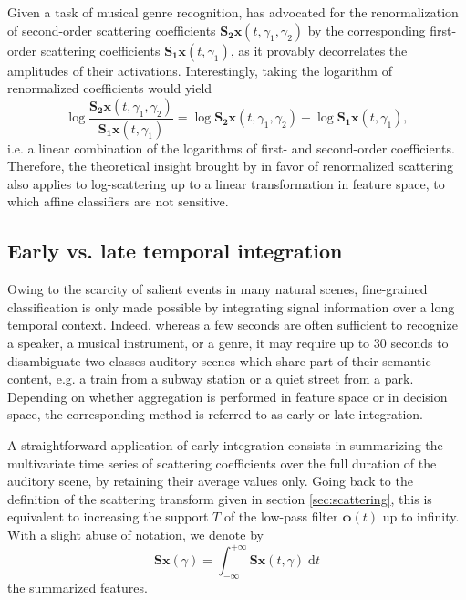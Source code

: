 \documentclass[journal]{IEEEtran}
\makeatletter
\newcommand*{\eg}{e.g.\@\xspace}
\newcommand*{\ie}{i.e.\@\xspace}
\newcommand*{\vs}{vs.\@\xspace}
\makeatother
\begin{document}
Given a task of musical genre recognition, \cite{Anden2014} has advocated for the renormalization of second-order scattering coefficients $\mathbf{S_2}\boldsymbol{x}(t,\gamma_1,\gamma_2)$ by the corresponding first-order scattering coefficients $\mathbf{S_1}\boldsymbol{x}(t,\gamma_1)$, as it provably decorrelates the amplitudes of their activations.
Interestingly, taking the logarithm of renormalized coefficients would yield
\begin{equation}
\log \dfrac{\mathbf{S_2}\boldsymbol{x}(t,\gamma_1,\gamma_2)}{\mathbf{S_1}\boldsymbol{x}(t,\gamma_1)} =
\log \mathbf{S_2}\boldsymbol{x}(t, \gamma_1, \gamma_2) -
\log \mathbf{S_1}\boldsymbol{x}(t, \gamma_1),
\end{equation}
\ie a linear combination of the logarithms of first- and second-order coefficients.
Therefore, the theoretical insight brought by \cite{Anden2014} in favor of renormalized scattering also applies to log-scattering up to a linear transformation in feature space, to which affine classifiers are not sensitive.

\subsection{Early \vs late temporal integration}
\label{sec:eili}

Owing to the scarcity of salient events in many natural scenes,
fine-grained classification is only made
possible by integrating signal information over a long temporal context.
Indeed, whereas a few seconds are often sufficient to recognize a speaker,
a musical instrument, or a genre, it may require up to 30 seconds
to disambiguate two classes auditory scenes which share part of their semantic content, \eg a train from a subway station or a quiet street from a park.
Depending on whether aggregation is performed in feature space or in decision space, the corresponding method is referred to as early or late integration.

A straightforward application of early integration consists in summarizing the multivariate time series of scattering coefficients over the full duration of the auditory scene, by retaining their average values only.
Going back to the definition of the scattering transform given in section \ref{sec:scattering}, this is equivalent to increasing the support $T$ of the low-pass filter $\boldsymbol{\phi}(t)$ up to infinity. With a slight abuse of notation, we denote by
\begin{equation}
\mathbf{S}\boldsymbol{x}(\gamma) =
\int_{-\infty}^{+\infty} \mathbf{S}\boldsymbol{x}(t,\gamma)\;\mathrm{d}t
\end{equation}
the summarized features.
\end{document}
